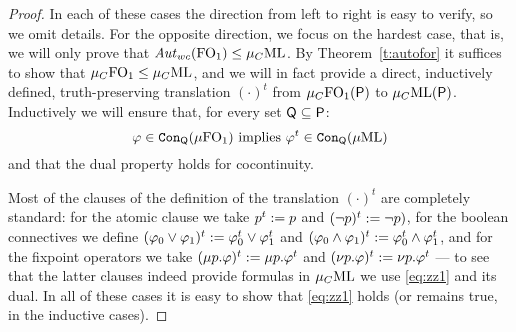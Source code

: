 \begin{proof}
In each of these cases the direction from left to right is easy to verify,
so we omit details.
For the opposite direction, we focus on the hardest case, that is, we will 
only prove that $\mathit{Aut}_{wc}(\mathrm{FO}_1) \leq \mu_{C}\mathrm{ML}$.
By Theorem~\ref{t:autofor} it suffices to show that $\mu_{C}\mathrm{FO}_1 \leq \mu_{C}\mathrm{ML}$,
and we will in fact provide a direct, inductively defined, truth-preserving 
translation $(\cdot)^{t}$ from $\mu_{C}\mathrm{FO}_1(\mathsf{P})$ to $\mu_{C}\mathrm{ML}(\mathsf{P})$.
Inductively we will ensure that, for every set $\mathsf{Q} \subseteq \mathsf{P}$:
\begin{equation}
\label{eq:zz1}
\phi \in \cont{\mu\ofo}{\qprop} %
\text{ implies } \phi^{t} \in 
\cont{\muML}{\qprop} %
\end{equation}
and that the dual property holds for cocontinuity.

Most of the clauses of the definition of the translation $(\cdot)^{t}$ are 
completely standard: for the atomic clause we take $p^{t} \mathrel{:=} p$ and
$(\neg p)^{t} \mathrel{:=} \neg p)$, for the boolean connectives we define 
$(\varphi_{0}\lor\varphi_{1})^{t} \mathrel{:=} \varphi_{0}^{t} \lor \varphi_{1}^{t}$ and 
$(\varphi_{0}\land\varphi_{1})^{t} \mathrel{:=} \varphi_{0}^{t} \land \varphi_{1}^{t}$, and 
for the fixpoint operators we take $(\mu p. \varphi)^{t} \mathrel{:=} \mu p. \varphi^{t}$ 
and $(\nu p. \varphi)^{t} \mathrel{:=} \nu p. \varphi^{t}$ ---
to see that the latter clauses indeed provide formulas in $\mu_{C}\mathrm{ML}$ we use
\eqref{eq:zz1} and its dual.
In all of these cases it is easy to show that \eqref{eq:zz1} holds (or remains
true, in the inductive cases).


\end{proof}
